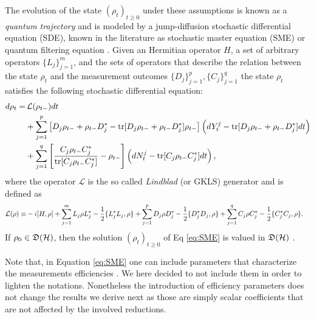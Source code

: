 \documentclass[aihp,12pt]{imsart}
\begin{document}
The evolution of the state \((\rho_t)_{t\geq0}\) under these assumptions is known as a {\em quantum trajectory} and is modeled by a jump-diffusion stochastic differential equation (SDE), known in the literature as stochastic master equation (SME) \cite{barchielli2009quantum} or quantum filtering equation \cite{BELAVKIN1992171,bouten2007introduction}. Given an Hermitian operator $H$, a set of arbitrary operators $\{L_j\}_{j=1}^m$, and the sets of operators that describe the relation between the state $\rho_t$ and the measurement outcomes $\{D_j\}_{j=1}^p,\{C_j\}_{j=1}^q$ the state $\rho_t$ satisfies the following stochastic differential equation:
\begin{equation}
\begin{split}
    d\rho_t = &\, \mathcal{L}(\rho_{t-}) dt\\& + \sum_{j=1}^{p} \left[ D_j\rho_{t-}+\rho_{t-} D_j^* -{\rm tr}[D_j\rho_{t-}+\rho_{t-} D_j^*]\rho_{t-} \right] \left(dY_t^j-{\rm tr}[D_j\rho_{t-}+\rho_{t-} D_j^*] dt\right)\\ & +  \sum_{j=1}^{q}\left[\frac{C_j\rho_{t-} C_j^*}{{\rm tr}[C_j\rho_{t-} C_j^*]}-\rho_{t-}\right]\left(dN_t^j-{\rm tr}[C_j\rho_{t-} C_j^*]dt\right),
\end{split}
    \label{eq:SME}
\end{equation}
where the operator $\mathcal L$ is the so called \emph{Lindblad} (or GKLS) generator and is defined as
\begin{equation}
    \begin{split}
        \mathcal{L}(\rho) \equiv&  -i[H,\rho] + \sum_{j=1}^m L_j\rho L_j^*-\frac{1}{2}\{L_j^* L_j,\rho\} + \sum_{j=1}^p D_j\rho D_j^*-\frac{1}{2}\{D_j^* D_j,\rho\} + \sum_{j=1}^q C_j\rho C_j^*-\frac{1}{2}\{C_j^* C_j,\rho\}.
    \end{split}
\end{equation}
If $\rho_0\in \mathfrak{D}(\mathcal{H})$, then the solution $(\rho_t)_{t\geq 0}$ of Eq \eqref{eq:SME} is valued in $\mathfrak{D}(\mathcal{H})$ \cite{pellegrini2010markov}. 

Note that, in Equation \eqref{eq:SME} one can include parameters that characterize the measurements efficiencies \cite{1amini2014stability}. We here decided to not include them in order to lighten the notations. Nonetheless the introduction of efficiency parameters does not change the results we derive next as those are simply scalar coefficients that are not affected by the involved reductions. 
\bigskip
\end{document}
